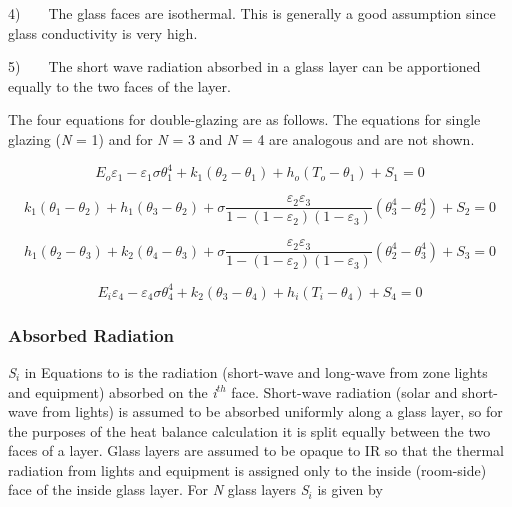 4)~~~~The glass faces are isothermal. This is generally a good assumption since glass conductivity is very high.

5)~~~~The short wave radiation absorbed in a glass layer can be apportioned equally to the two faces of the layer.

The four equations for double-glazing are as follows. The equations for single glazing (\emph{N} = 1) and for \emph{N} = 3 and \emph{N} = 4 are analogous and are not shown.

\begin{equation}
{E_o}{\varepsilon_1} - {\varepsilon_1}\sigma \theta_1^4 + {k_1}\left( {{\theta_2} - {\theta_1}} \right) + {h_o}\left( {{T_o} - {\theta_1}} \right) + {S_1} = 0
\end{equation}

\begin{equation}
{k_1}\left( {{\theta_1} - {\theta_2}} \right) + {h_1}\left( {{\theta_3} - {\theta_2}} \right) + \sigma \frac{{{\varepsilon_2}{\varepsilon_3}}}{{1 - \left( {1 - {\varepsilon_2}} \right)\left( {1 - {\varepsilon_3}} \right)}}\left( {\theta_3^4 - \theta_2^4} \right) + {S_2} = 0
\end{equation}

\begin{equation}
{h_1}({\theta_2} - {\theta_3}) + {k_2}({\theta_4} - {\theta_3}) + \sigma \frac{{{\varepsilon_2}{\varepsilon_3}}}{{1 - \left( {1 - {\varepsilon_2}} \right)\left( {1 - {\varepsilon_3}} \right)}}\left( {\theta_2^4 - \theta_3^4} \right) + {S_3} = 0
\end{equation}

\begin{equation}
{E_i}{\varepsilon_4} - {\varepsilon_4}\sigma \theta_4^4 + {k_2}\left( {{\theta_3} - {\theta_4}} \right) + {h_i}\left( {{T_i} - {\theta_4}} \right) + {S_4} = 0
\end{equation}

\subsubsection{Absorbed Radiation}\label{absorbed-radiation}

\emph{S\(_{i}\)} in Equations to is the radiation (short-wave and long-wave from zone lights and equipment) absorbed on the \emph{i}\(^{th}\) face. Short-wave radiation (solar and short-wave from lights) is assumed to be absorbed uniformly along a glass layer, so for the purposes of the heat balance calculation it is split equally between the two faces of a layer. Glass layers are assumed to be opaque to IR so that the thermal radiation from lights and equipment is assigned only to the inside (room-side) face of the inside glass layer. For \emph{N} glass layers \emph{S\(_{i}\)} is given by

